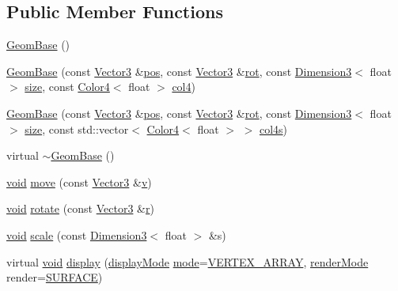 \subsection*{Public Member Functions}
\begin{DoxyCompactItemize}
\item 
\hyperlink{class_geom_base_a3321d8df2aabb01e54cebc102051626d}{Geom\-Base} ()
\item 
\hyperlink{class_geom_base_a9ebb09df37f80ec29489710fc3eb8775}{Geom\-Base} (const \hyperlink{class_vector3}{Vector3} \&\hyperlink{class_geom_base_ace2fc0557767dbb702aaf1655a85ed92}{pos}, const \hyperlink{class_vector3}{Vector3} \&\hyperlink{class_geom_base_a7de363bab1e976c73e495cf973a51de7}{rot}, const \hyperlink{class_dimension3}{Dimension3}$<$ float $>$ \hyperlink{gl3_8h_a79ef9eb3e59c4bb34c4b9fbeb8d28ff7}{size}, const \hyperlink{class_color4}{Color4}$<$ float $>$ \hyperlink{class_geom_base_acd58b67fcdac4428f66bea2c58c3aad8}{col4})
\item 
\hyperlink{class_geom_base_ae967f73a791c307df2aa08d00dcf908a}{Geom\-Base} (const \hyperlink{class_vector3}{Vector3} \&\hyperlink{class_geom_base_ace2fc0557767dbb702aaf1655a85ed92}{pos}, const \hyperlink{class_vector3}{Vector3} \&\hyperlink{class_geom_base_a7de363bab1e976c73e495cf973a51de7}{rot}, const \hyperlink{class_dimension3}{Dimension3}$<$ float $>$ \hyperlink{gl3_8h_a79ef9eb3e59c4bb34c4b9fbeb8d28ff7}{size}, const std\-::vector$<$ \hyperlink{class_color4}{Color4}$<$ float $>$ $>$ \hyperlink{class_geom_base_a0a55c12de2788567600e4477017df3fb}{col4s})
\item 
virtual \hyperlink{class_geom_base_acbba0a4d5b9bcdb0564efc8696f52fc6}{$\sim$\-Geom\-Base} ()
\item 
\hyperlink{glutf90_8h_ac778d6f63f1aaf8ebda0ce6ac821b56e}{void} \hyperlink{class_geom_base_aa62a1d16a4b8bc95be85faa4f454ec89}{move} (const \hyperlink{class_vector3}{Vector3} \&\hyperlink{gl3_8h_a14cfbe2fc2234f5504618905b69d1e06}{v})
\item 
\hyperlink{glutf90_8h_ac778d6f63f1aaf8ebda0ce6ac821b56e}{void} \hyperlink{class_geom_base_aaf54ae14260d05c92a915c3736693ee8}{rotate} (const \hyperlink{class_vector3}{Vector3} \&\hyperlink{gl3_8h_abe08814c2f72843fde4d8df41440d5a0}{r})
\item 
\hyperlink{glutf90_8h_ac778d6f63f1aaf8ebda0ce6ac821b56e}{void} \hyperlink{class_geom_base_ac1a2a5b5e8538f0a881eb93acb27d760}{scale} (const \hyperlink{class_dimension3}{Dimension3}$<$ float $>$ \&s)
\item 
virtual \hyperlink{glutf90_8h_ac778d6f63f1aaf8ebda0ce6ac821b56e}{void} \hyperlink{class_geom_base_abdf4aad3e45d3f71bcfa653c5200b9a6}{display} (\hyperlink{class_geom_base_a3259d41feab8f1c2b3e93e44ea06c8eb}{display\-Mode} \hyperlink{gl3_8h_a1e71d9c196e4683cc06c4b54d53f7ef5}{mode}=\hyperlink{class_geom_base_a3259d41feab8f1c2b3e93e44ea06c8eba68fe3d2e6fab911d713140e124294e9b}{V\-E\-R\-T\-E\-X\-\_\-\-A\-R\-R\-A\-Y}, \hyperlink{class_geom_base_a5ac81c5c0144bf51c40efc219f1973e2}{render\-Mode} render=\hyperlink{class_geom_base_a5ac81c5c0144bf51c40efc219f1973e2a5795acdbf2229751e91ab3bf59fec100}{S\-U\-R\-F\-A\-C\-E})

\end{DoxyCompactItemize}
